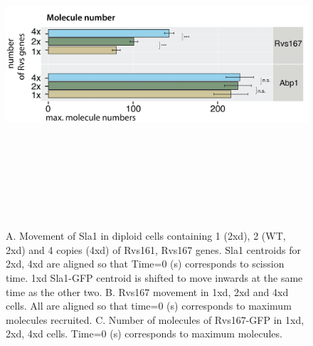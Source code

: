 \vspace{3mm}
	\begin{figure}[H]
	\centering
	\hspace{-2cm}
	\includegraphics[width=12cm,height=12cm,keepaspectratio]{figures/results_final/protein_frictionB_4}
	\vspace*{2mm}
	\caption[Titration of Rvs molecule numbers in diploid cells]
	{A. Movement of Sla1 in diploid cells containing 1 (2xd), 2 (WT, 2xd) and 4 copies (4xd) of Rvs161, Rvs167 genes. Sla1 centroids for 2xd, 4xd are aligned so that Time=0 (s) corresponds to scission time. 1xd Sla1-GFP centroid is shifted to move inwards at the same time as the other two.
		B. Rvs167 movement in 1xd, 2xd and 4xd cells. All are aligned so that time=0 (s) corresponds to maximum molecules recruited.
		C.  Number of molecules of Rvs167-GFP in 1xd, 2xd, 4xd cells. Time=0 (s) corresponds to maximum molecules. 
		\label{fig_rvsdiploid2}}
\end{figure}




				
			




\newpage
